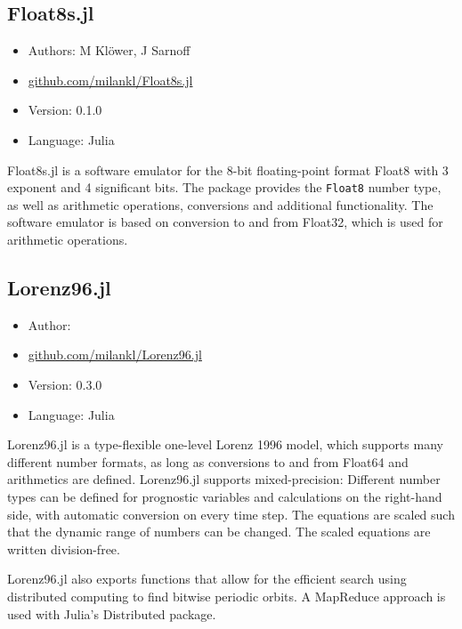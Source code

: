 \subsection{Float8s.jl}

\begin{itemize}
    \setlength\itemsep{-5pt}
    \item Authors: M Klöwer, J Sarnoff
    \item \href{https://github.com/milankl/Float8s.jl}{github.com/milankl/Float8s.jl}
    \item Version: 0.1.0
    \item Language: Julia
\end{itemize}

Float8s.jl is a software emulator for the 8-bit floating-point format Float8 with 3 exponent and 4 significant bits. The package provides the \texttt{Float8} number type,
as well as arithmetic operations, conversions and additional functionality. The software emulator is based on conversion to and from Float32, which is used for arithmetic operations.

\subsection{Lorenz96.jl}

\begin{itemize}
    \setlength\itemsep{-5pt}
    \item Author: \cite{Klower2021e}
    \item \href{https://github.com/milankl/Lorenz96.jl}{github.com/milankl/Lorenz96.jl}
    \item Version: 0.3.0
    \item Language: Julia
\end{itemize}

Lorenz96.jl is a type-flexible one-level Lorenz 1996 model, which supports many different number formats, as long as conversions to and from Float64 and arithmetics are defined.
Lorenz96.jl supports mixed-precision: Different number types can be defined for prognostic variables and calculations on the right-hand side, with automatic conversion on every time step.
The equations are scaled such that the dynamic range of numbers can be changed. The scaled equations are written division-free.

Lorenz96.jl also exports functions that allow for the efficient search using distributed computing to find bitwise periodic orbits. A MapReduce approach is used with Julia's Distributed package.

